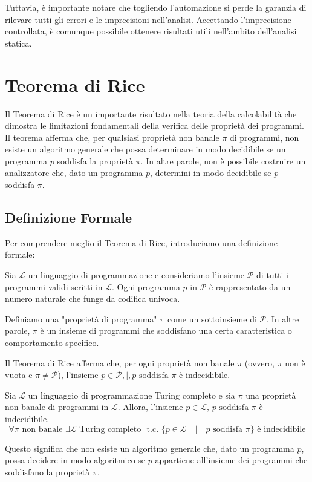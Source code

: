 Tuttavia, è importante notare che togliendo l'automazione si perde la garanzia di rilevare
tutti gli errori e le imprecisioni nell'analisi. Accettando l'imprecisione controllata, è
comunque possibile ottenere risultati utili nell'ambito dell'analisi statica.

\section{Teorema di Rice}

Il Teorema di Rice è un importante risultato nella
teoria della calcolabilità che dimostra le limitazioni fondamentali della verifica
delle proprietà dei programmi. Il teorema afferma che, per qualsiasi proprietà non banale
$\pi$ di programmi, non esiste un algoritmo generale che possa determinare in modo decidibile
se un programma $p$ soddisfa la proprietà $\pi$. In altre parole, non è possibile costruire un
analizzatore che, dato un programma $p$, determini in modo decidibile se $p$ soddisfa $\pi$.

\subsection{Definizione Formale}

Per comprendere meglio il Teorema di Rice, introduciamo una definizione formale:

Sia $\mathcal{L}$ un linguaggio di programmazione e consideriamo l'insieme $\mathcal{P}$
di tutti i programmi validi scritti in $\mathcal{L}$. Ogni programma $p$ in $\mathcal{P}$ è
rappresentato da un numero naturale che funge da codifica univoca.

Definiamo una "proprietà di programma" $\pi$ come un sottoinsieme di $\mathcal{P}$. In altre parole,
$\pi$ è un insieme di programmi che soddisfano una certa caratteristica o comportamento specifico.

Il Teorema di Rice afferma che, per ogni proprietà non banale $\pi$ (ovvero, $\pi$ non è vuota e
$\pi \neq \mathcal{P}$), l'insieme ${p \in \mathcal{P} ,|, p \text{ soddisfa } \pi}$ è indecidibile.
\begin{tcolorbox}[title = {Teorema di Rice}]
    Sia $\mathcal{L}$ un linguaggio di programmazione Turing completo e sia $\pi$ una proprietà non banale
    di programmi in $\mathcal{L}$. Allora, l'insieme ${p \in \mathcal{L} ,\, p \text{ soddisfa } \pi}$ è indecidibile.
    \[
      \forall \pi \text{ non banale } \exists \mathcal{L} \text{ Turing completo } \text{ t.c. } \{p \in \mathcal{L} \quad |
      \quad p \text{ soddisfa } \pi\} \text{ è indecidibile}  
    \]
\end{tcolorbox}
Questo significa che non esiste un algoritmo generale che, dato un programma $p$,
possa decidere in modo algoritmico se $p$ appartiene all'insieme dei programmi che
soddisfano la proprietà $\pi$.
